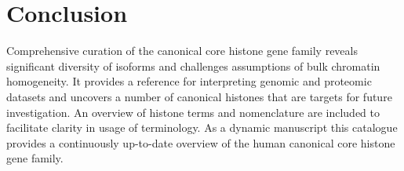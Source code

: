\section{Conclusion}
\label{sec:conclusion}

  Comprehensive curation of the canonical core histone gene family
  reveals significant diversity of isoforms
  and challenges assumptions of bulk chromatin homogeneity.
  It provides a reference for interpreting genomic and proteomic datasets
  and uncovers a number of canonical histones that are targets for future investigation.
  An overview of histone terms and nomenclature
  are included to facilitate clarity in usage of terminology.
  As a dynamic manuscript this catalogue provides a continuously up-to-date overview
  of the human canonical core histone gene family.
